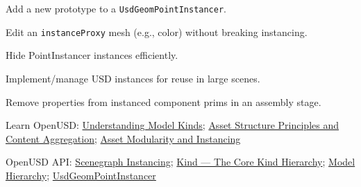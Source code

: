 
\begin{Objectives}
  \item Add a new prototype to a \texttt{UsdGeomPointInstancer}.
  \item Edit an \texttt{instanceProxy} mesh (e.g., color) without breaking instancing.
  \item Hide PointInstancer instances efficiently.
  \item Implement/manage USD instances for reuse in large scenes.
  \item Remove properties from instanced component prims in an assembly stage.
\end{Objectives}

\begin{Resources}
  \item Learn OpenUSD: \href{https://docs.nvidia.com/learn-openusd/latest/beyond-basics/model-kinds.html}{Understanding Model Kinds};
        \href{https://docs.nvidia.com/learn-openusd/latest/asset-structure/index.html}{Asset Structure Principles and Content Aggregation};
        \href{https://docs.nvidia.com/learn-openusd/latest/asset-modularity-instancing/index.html}{Asset Modularity and Instancing}
  \item OpenUSD API: \href{https://openusd.org/release/api/_usd__page__scenegraph_instancing.html}{Scenegraph Instancing};
        \href{https://openusd.org/release/api/kind_page_front.html#kind_coreKinds}{Kind --- The Core Kind Hierarchy};
        \href{https://openusd.org/release/api/_usd__page__properties_of_scene_description.html#Usd_ModelHierarchy}{Model Hierarchy};
        \href{https://openusd.org/release/api/class_usd_geom_point_instancer.html}{UsdGeomPointInstancer}
\end{Resources}

